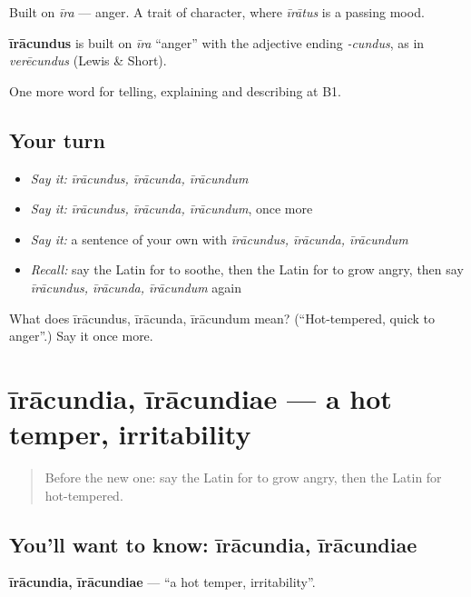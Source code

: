 Built on \emph{īra} — anger. A trait of character, where \emph{īrātus} is a passing mood.

\begin{cousinweb}
\textbf{īrācundus} is built on \emph{īra} \textquotedblleft{}anger\textquotedblright{} with the adjective ending \emph{-cundus}, as in \emph{verēcundus} (Lewis \& Short).
\end{cousinweb}

\begin{grammarlens}[title={What you've built}]
One more word for telling, explaining and describing at B1.
\end{grammarlens}

\subsection*{Your turn}
\begin{itemize}
\raggedright
  \item \emph{Say it:} \emph{īrācundus, īrācunda, īrācundum}
  \item \emph{Say it:} \emph{īrācundus, īrācunda, īrācundum}, once more
  \item \emph{Say it:} a sentence of your own with \emph{īrācundus, īrācunda, īrācundum}
  \item \emph{Recall:} say the Latin for to soothe, then the Latin for to grow angry, then say \emph{īrācundus, īrācunda, īrācundum} again
\end{itemize}

\begin{tcolorbox}[breakable,colback=teal!4,colframe=teal!35!black,title={Before you move on}]
What does īrācundus, īrācunda, īrācundum mean? (\textquotedblleft{}Hot-tempered, quick to anger\textquotedblright{}.) Say it once more.
\end{tcolorbox}
\section[īrācundia, īrācundiae]{īrācundia, īrācundiae — a hot temper, irritability}

\label{lesson:LA-C493-iracundia}



\begin{quote}
Before the new one: say the Latin for to grow angry, then the Latin for hot-tempered.
\end{quote}

\subsection*{You'll want to know: īrācundia, īrācundiae}
\textbf{īrācundia, īrācundiae} — \textquotedblleft{}a hot temper, irritability\textquotedblright{}.

